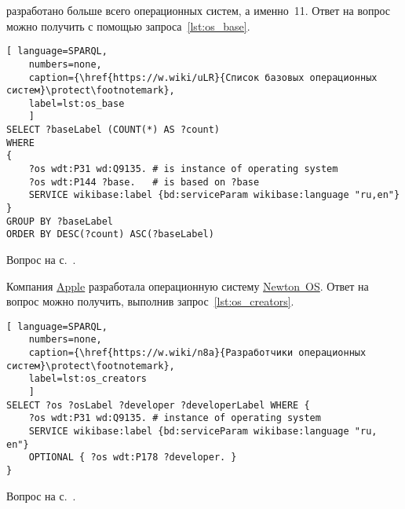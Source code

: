 \begin{task}
\label{answer:os_base}
    разработано больше всего операционных систем, а именно~11. 
    Ответ на вопрос можно получить с помощью запроса~\ref{lst:os_base}.

\begin{lstlisting}[ language=SPARQL, 
    numbers=none,
    caption={\href{https://w.wiki/uLR}{Список базовых операционных систем}\protect\footnotemark},
	label=lst:os_base
	]
SELECT ?baseLabel (COUNT(*) AS ?count)
WHERE
{
	?os wdt:P31 wd:Q9135. # is instance of operating system
	?os wdt:P144 ?base.   # is based on ?base
	SERVICE wikibase:label {bd:serviceParam wikibase:language "ru,en"}
}
GROUP BY ?baseLabel
ORDER BY DESC(?count) ASC(?baseLabel)\end{lstlisting}

\small{\AnswerBackref Вопрос на с.~\pageref{lst:base_of_operating_systems}.}
\end{task}



\begin{task}
\label{answer:what_system_created}
Компания \href{https://w.wiki/n8S}{Apple} разработала 
    операционную систему \href{https://w.wiki/n8P}{Newton~OS}. 
    Ответ на вопрос можно получить, выполнив запрос~\ref{lst:os_creators}.

\begin{lstlisting}[ language=SPARQL, 
    numbers=none,
    caption={\href{https://w.wiki/n8a}{Разработчики операционных систем}\protect\footnotemark},
	label=lst:os_creators
	]
SELECT ?os ?osLabel ?developer ?developerLabel WHERE {
	?os wdt:P31 wd:Q9135. # instance of operating system
	SERVICE wikibase:label {bd:serviceParam wikibase:language "ru, en"}
	OPTIONAL { ?os wdt:P178 ?developer. }
}\end{lstlisting}

\small{\AnswerBackref Вопрос на с.~\pageref{lst:inception_time_of_operating_systems}.}
\end{task}




